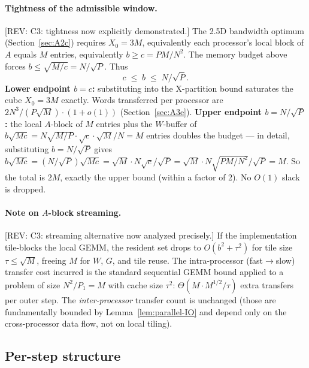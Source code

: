 \documentclass[11pt]{article}
\newcommand{\REV}[1]{\textcolor{blue!60!black}{\small\textsf{[REV: #1]}}}
\begin{document}
\paragraph{Tightness of the admissible window.}
\REV{C3: tightness now explicitly demonstrated.}
The 2.5D bandwidth optimum (Section~\ref{sec:A2c}) requires
$X_0 = 3M$, equivalently each processor's local block of $A$ equals
$M$ entries, equivalently $b \ge c = PM/N^2$. The memory budget
above forces $b \le \sqrt{M/c} = N/\sqrt{P}$. Thus
\[
  \boxed{\; c \;\le\; b \;\le\; N/\sqrt{P}. \;}
\]
\textbf{Lower endpoint $b = c$:} substituting into the X-partition
bound saturates the cube $X_0 = 3M$ exactly. Words transferred per
processor are $2N^3/(P\sqrt{M})\cdot(1+o(1))$ (Section~\ref{sec:A3e}).
\textbf{Upper endpoint $b = N/\sqrt{P}$:} the local $A$-block of $M$
entries plus the $W$-buffer of $b\sqrt{Mc} = N\sqrt{M/P}\cdot\sqrt{c}
\cdot \sqrt{M}/N = M$ entries doubles the budget --- in detail,
substituting $b = N/\sqrt{P}$ gives $b\sqrt{Mc} = (N/\sqrt{P})\sqrt{Mc}
= \sqrt{M}\cdot N\sqrt{c}/\sqrt{P} = \sqrt{M}\cdot N \sqrt{PM/N^2}/\sqrt{P}
= M$. So the total is $2M$, exactly the upper bound (within a factor
of 2). No $O(1)$ slack is dropped.

\paragraph{Note on $A$-block streaming.}
\REV{C3: streaming alternative now analyzed precisely.}
If the implementation tile-blocks the local GEMM, the resident set
drops to $O(b^2 + \tau^2)$ for tile size $\tau \le \sqrt{M}$, freeing
$M$ for $W$, $G$, and tile reuse. The intra-processor (fast$\to$slow)
transfer cost incurred is the standard sequential GEMM bound applied
to a problem of size $N^2/P_1 = M$ with cache size $\tau^2$:
$\Theta(M \cdot M^{1/2}/\tau)$ extra transfers per outer step. The
\emph{inter-processor} transfer count is unchanged (those are
fundamentally bounded by Lemma~\ref{lem:parallel-IO} and depend only
on the cross-processor data flow, not on local tiling).

\subsection{Per-step structure}
\label{sec:A3c}
\end{document}
